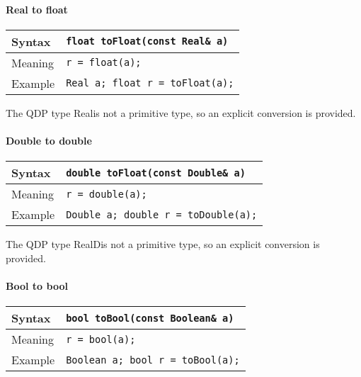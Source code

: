 \documentclass[12pt,letterpaper]{article}
\newcommand{\tReal}{Real}
\newcommand{\tRealD}{RealD}
\begin{document}
\paragraph{Real to float} 

\begin{flushleft}
  \begin{tabular}{|l|l|}
  \hline
  Syntax      & {\tt float toFloat(const Real\& a)} \\
  \hline
  Meaning     & \verb|r = float(a);|\\
  \hline
  Example     & \verb|Real a; float r = toFloat(a);| \\
  \hline
  \end{tabular}
\end{flushleft}

The QDP type \tReal is not a primitive type, so an explicit conversion is provided.

\paragraph{Double to double} 

\begin{flushleft}
  \begin{tabular}{|l|l|}
  \hline
  Syntax      & {\tt double toFloat(const Double\& a)} \\
  \hline
  Meaning     & \verb|r = double(a);|\\
  \hline
  Example     & \verb|Double a; double r = toDouble(a);| \\
  \hline
  \end{tabular}
\end{flushleft}

The QDP type \tRealD is not a primitive type, so an explicit conversion is provided.

\paragraph{Bool to bool} 

\begin{flushleft}
  \begin{tabular}{|l|l|}
  \hline
  Syntax      & {\tt bool toBool(const Boolean\& a)} \\
  \hline
  Meaning     & \verb|r = bool(a);|\\
  \hline
  Example     & \verb|Boolean a; bool r = toBool(a);| \\
  \hline
  \end{tabular}
\end{flushleft}
\end{document}
